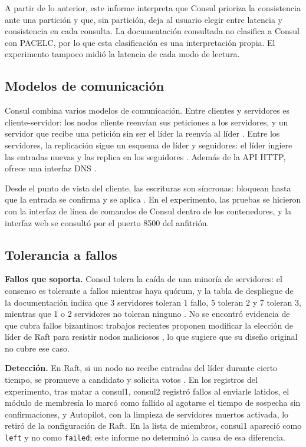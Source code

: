 \documentclass[12pt,a4paper]{article}
\begin{document}
A partir de lo anterior, este informe interpreta que Consul prioriza la consistencia ante una
partición y que, sin partición, deja al usuario elegir entre latencia y consistencia en cada
consulta. La documentación consultada no clasifica a Consul con PACELC, por lo que esta
clasificación es una interpretación propia. El experimento tampoco midió la latencia de cada
modo de lectura.

\subsection{Modelos de comunicación}

Consul combina varios modelos de comunicación. Entre clientes y servidores es cliente-servidor:
los nodos cliente reenvían sus peticiones a los servidores, y un servidor que recibe una
petición sin ser el líder la reenvía al líder \cite{consul_consensus}. Entre los servidores, la
replicación sigue un esquema de líder y seguidores: el líder ingiere las entradas nuevas y las
replica en los seguidores \cite{consul_consensus}. Además de la API HTTP, ofrece una interfaz
DNS \cite{etcd_why}.

Desde el punto de vista del cliente, las escrituras son síncronas: bloquean hasta que la
entrada se confirma y se aplica \cite{consul_consensus}. En el experimento, las pruebas se
hicieron con la interfaz de línea de comandos de Consul dentro de los contenedores, y la
interfaz web se consultó por el puerto 8500 del anfitrión.

\subsection{Tolerancia a fallos}

\textbf{Fallos que soporta.} Consul tolera la caída de una minoría de servidores: el consenso
es tolerante a fallos mientras haya quórum, y la tabla de despliegue de la documentación indica
que 3 servidores toleran 1 fallo, 5 toleran 2 y 7 toleran 3, mientras que 1 o 2 servidores no
toleran ninguno \cite{consul_consensus}. No se encontró evidencia de que cubra fallos
bizantinos: trabajos recientes proponen modificar la elección de líder de Raft para resistir
nodos maliciosos \cite{lu2023praft,li2024mec}, lo que sugiere que su diseño original no cubre ese
caso.

\textbf{Detección.} En Raft, si un nodo no recibe entradas del líder durante cierto tiempo, se
promueve a candidato y solicita votos \cite{consul_consensus}. En los registros del
experimento, tras matar a consul1, consul2 registró fallos al enviarle latidos, el módulo de
membresía lo marcó como fallido al agotarse el tiempo de sospecha sin confirmaciones, y
Autopilot, con la limpieza de servidores muertos activada, lo retiró de la configuración de
Raft. En la lista de miembros, consul1 apareció como \texttt{left} y no como \texttt{failed};
este informe no determinó la causa de esa diferencia.
\end{document}
